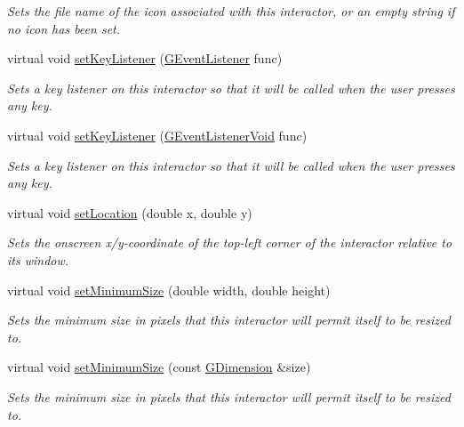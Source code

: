\begin{DoxyCompactItemize}
\begin{DoxyCompactList}\small\item\em Sets the file name of the icon associated with this interactor, or an empty string if no icon has been set. \end{DoxyCompactList}\item 
virtual void \mbox{\hyperlink{classsgl_1_1GInteractor_aeb8324d3287fa1fbe093f4d6230cf0a6}{set\+Key\+Listener}} (\mbox{\hyperlink{namespacesgl_ae9f3e9eab70035da1a2b114e21357b25}{G\+Event\+Listener}} func)
\begin{DoxyCompactList}\small\item\em Sets a key listener on this interactor so that it will be called when the user presses any key. \end{DoxyCompactList}\item 
virtual void \mbox{\hyperlink{classsgl_1_1GInteractor_ae48ecea73606c7bd9423e1c7cc589cc9}{set\+Key\+Listener}} (\mbox{\hyperlink{namespacesgl_a54427ce97bb1c2804e4fe2b0a62e8b17}{G\+Event\+Listener\+Void}} func)
\begin{DoxyCompactList}\small\item\em Sets a key listener on this interactor so that it will be called when the user presses any key. \end{DoxyCompactList}\item 
virtual void \mbox{\hyperlink{classsgl_1_1GInteractor_a04594e8ba9b98513a64f1da00dcae18c}{set\+Location}} (double x, double y)
\begin{DoxyCompactList}\small\item\em Sets the onscreen x/y-\/coordinate of the top-\/left corner of the interactor relative to its window. \end{DoxyCompactList}\item 
virtual void \mbox{\hyperlink{classsgl_1_1GInteractor_a0cf428e207b7f22cc08138a90b1b87b2}{set\+Minimum\+Size}} (double width, double height)
\begin{DoxyCompactList}\small\item\em Sets the minimum size in pixels that this interactor will permit itself to be resized to. \end{DoxyCompactList}\item 
virtual void \mbox{\hyperlink{classsgl_1_1GInteractor_a3b1046117ac6cb7abe467e00ba8a81f4}{set\+Minimum\+Size}} (const \mbox{\hyperlink{structsgl_1_1GDimension}{G\+Dimension}} \&size)
\begin{DoxyCompactList}\small\item\em Sets the minimum size in pixels that this interactor will permit itself to be resized to. \end{DoxyCompactList}\item 

\end{DoxyCompactItemize}
